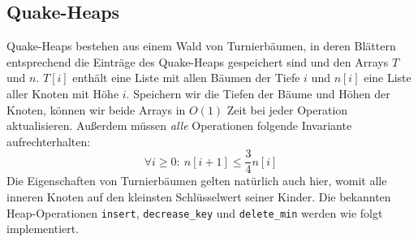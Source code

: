 \documentclass[a4paper,10pt]{article}
\begin{document}
\subsection{Quake-Heaps}
Quake-Heaps bestehen aus einem Wald von Turnierbäumen, in deren Blättern entsprechend die Einträge des Quake-Heaps gespeichert sind und den Arrays $T$ und $n$.
$T[i]$ enthält eine Liste mit allen Bäumen der Tiefe $i$ und $n[i]$ eine Liste aller Knoten mit Höhe $i$.
Speichern wir die Tiefen der Bäume und Höhen der Knoten, können wir beide Arrays in $O(1)$ Zeit bei jeder Operation aktualisieren.
Außerdem müssen \emph{alle} Operationen folgende Invariante aufrechterhalten:
\[\forall i \geq 0{:}\ n[i+1] \leq \frac{3}{4} n[i]\]
Die Eigenschaften von Turnierbäumen gelten natürlich auch hier, womit alle inneren Knoten auf den kleinsten Schlüsselwert seiner Kinder.
Die bekannten Heap-Operationen \verb!insert!, \verb!decrease_key! und \verb!delete_min! werden wie folgt implementiert.
\end{document}
